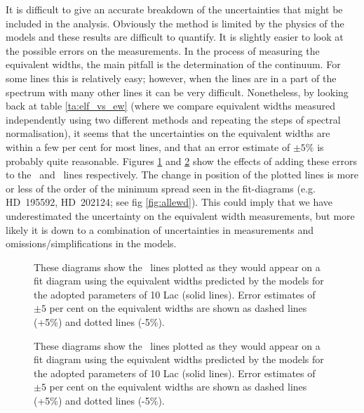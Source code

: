 It is difficult to give an accurate breakdown of the uncertainties that might
be included in the analysis. Obviously the method is limited by the
physics of the models and these results are difficult to quantify. It
is slightly easier to look at the possible errors on the
measurements. In the process of measuring the equivalent widths, the
main pitfall is the determination of the continuum. For some lines
this is relatively easy; however, when the lines are in a part of the
spectrum with many other lines it can be very difficult. Nonetheless, by
looking back at table \ref{ta:elf_vs_ew} (where we compare equivalent
widths measured independently using two different methods and
repeating the steps of spectral normalisation), it seems that the
uncertainties on the equivalent widths are within a few per cent for most
lines, and that an error estimate of $\pm 5\%$ is probably quite
reasonable. Figures \ref{fig:ew_errors:he1} and
\ref{fig:ew_errors:he2} show the effects of adding these errors to the
\hei\ and \heii\ lines respectively. The change in position of the
plotted lines is more or less of the order of the minimum spread seen
in the fit-diagrams (e.g. HD~195592, HD~202124; see fig
\ref{fig:allewd}). This could imply that we have underestimated the
uncertainty on the equivalent width measurements, but more likely it is
down to a combination of uncertainties in measurements and
omissions/simplifications in the models.

\begin{figure} %

\epsfxsize=12cm
\setlength{\cen}{(\textwidth / 2) - (\epsfxsize / 2)}
\hspace{\cen}

\caption[Equivalent widths of \hei\ lines plotted with errors]
{\fcfont These diagrams show the \hei\ lines plotted as they would
appear on a fit diagram using the equivalent widths predicted by the
models for the adopted parameters of 10 Lac (solid lines). Error
estimates of $\pm 5$ per cent on the equivalent widths are shown as
dashed lines (+5\%) and dotted lines (-5\%).}
\label{fig:ew_errors:he1}
\end{figure} %

\begin{figure} %

\epsfxsize=12cm
\setlength{\cen}{(\textwidth / 2) - (\epsfxsize / 2)}
\hspace{\cen}

\caption[Equivalent widths of \heii\ lines plotted with errors]
{\fcfont These diagrams show the \heii\ lines plotted as they would
appear on a fit diagram using the equivalent widths predicted by the
models for the adopted parameters of 10 Lac (solid lines). Error
estimates of $\pm 5$ per cent on the equivalent widths are shown as
dashed lines (+5\%) and dotted lines (-5\%).}
\label{fig:ew_errors:he2}
\end{figure} %



